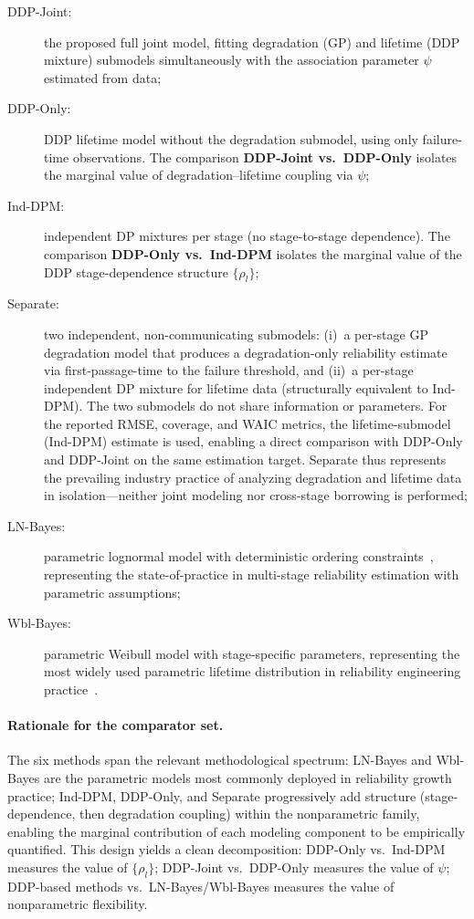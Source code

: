 \documentclass[a4paper,fleqn,longmktitle]{cas-sc}
\begin{document}
\begin{description}
    \item[DDP-Joint:] the proposed full joint model, fitting degradation (GP) and lifetime (DDP mixture) submodels simultaneously with the association parameter $\psi$ estimated from data;
    \item[DDP-Only:] DDP lifetime model without the degradation submodel, using only failure-time observations. The comparison \textbf{DDP-Joint vs.\ DDP-Only} isolates the marginal value of degradation--lifetime coupling via $\psi$;
    \item[Ind-DPM:] independent DP mixtures per stage (no stage-to-stage dependence). The comparison \textbf{DDP-Only vs.\ Ind-DPM} isolates the marginal value of the DDP stage-dependence structure $\{\rho_l\}$;
    \item[Separate:] two independent, non-communicating submodels: (i)~a per-stage GP degradation model that produces a degradation-only reliability estimate via first-passage-time to the failure threshold, and (ii)~a per-stage independent DP mixture for lifetime data (structurally equivalent to Ind-DPM). The two submodels do not share information or parameters. For the reported RMSE, coverage, and WAIC metrics, the lifetime-submodel (Ind-DPM) estimate is used, enabling a direct comparison with DDP-Only and DDP-Joint on the same estimation target. Separate thus represents the prevailing industry practice of analyzing degradation and lifetime data in isolation---neither joint modeling nor cross-stage borrowing is performed;
    \item[LN-Bayes:] parametric lognormal model with deterministic ordering constraints~\cite{Liu2026a}, representing the state-of-practice in multi-stage reliability estimation with parametric assumptions;
    \item[Wbl-Bayes:] parametric Weibull model with stage-specific parameters, representing the most widely used parametric lifetime distribution in reliability engineering practice~\cite{Gholami2022}.
\end{description}

\paragraph{Rationale for the comparator set.} The six methods span the relevant methodological spectrum: LN-Bayes and Wbl-Bayes are the parametric models most commonly deployed in reliability growth practice; Ind-DPM, DDP-Only, and Separate progressively add structure (stage-dependence, then degradation coupling) within the nonparametric family, enabling the marginal contribution of each modeling component to be empirically quantified. This design yields a clean decomposition: DDP-Only vs.\ Ind-DPM measures the value of $\{\rho_l\}$; DDP-Joint vs.\ DDP-Only measures the value of $\psi$; DDP-based methods vs.\ LN-Bayes/Wbl-Bayes measures the value of nonparametric flexibility.
\end{document}
